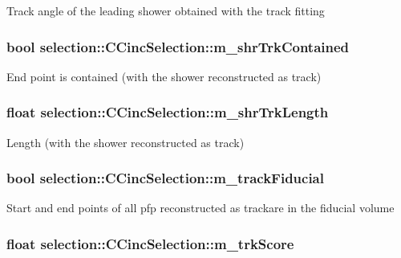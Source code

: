 Track angle of the leading shower obtained with the track fitting \hypertarget{classselection_1_1CCincSelection_a5cde5d5c0d798594d11f082dadaf52bc}{
\subsubsection[{m\-\_\-shr\-Trk\-Contained}]{\setlength{\rightskip}{0pt plus 5cm}bool selection\-::\-C\-Cinc\-Selection\-::m\-\_\-shr\-Trk\-Contained\hspace{0.3cm}{\ttfamily [private]}}}\label{classselection_1_1CCincSelection_a5cde5d5c0d798594d11f082dadaf52bc}
End point is contained (with the shower reconstructed as track) \hypertarget{classselection_1_1CCincSelection_a09db29c4170084b4c366defeb3330de8}{
\subsubsection[{m\-\_\-shr\-Trk\-Length}]{\setlength{\rightskip}{0pt plus 5cm}float selection\-::\-C\-Cinc\-Selection\-::m\-\_\-shr\-Trk\-Length\hspace{0.3cm}{\ttfamily [private]}}}\label{classselection_1_1CCincSelection_a09db29c4170084b4c366defeb3330de8}
Length (with the shower reconstructed as track) \hypertarget{classselection_1_1CCincSelection_a7f2d544a3260377cab6db80b8bf81302}{
\subsubsection[{m\-\_\-track\-Fiducial}]{\setlength{\rightskip}{0pt plus 5cm}bool selection\-::\-C\-Cinc\-Selection\-::m\-\_\-track\-Fiducial\hspace{0.3cm}{\ttfamily [private]}}}\label{classselection_1_1CCincSelection_a7f2d544a3260377cab6db80b8bf81302}
Start and end points of all pfp reconstructed as trackare in the fiducial volume \hypertarget{classselection_1_1CCincSelection_a2c3b80516e3731ec9b4f5ccbee6864ba}{
\subsubsection[{m\-\_\-trk\-Score}]{\setlength{\rightskip}{0pt plus 5cm}float selection\-::\-C\-Cinc\-Selection\-::m\-\_\-trk\-Score\hspace{0.3cm}{\ttfamily [private]}}}\label{classselection_1_1CCincSelection_a2c3b80516e3731ec9b4f5ccbee6864ba}
